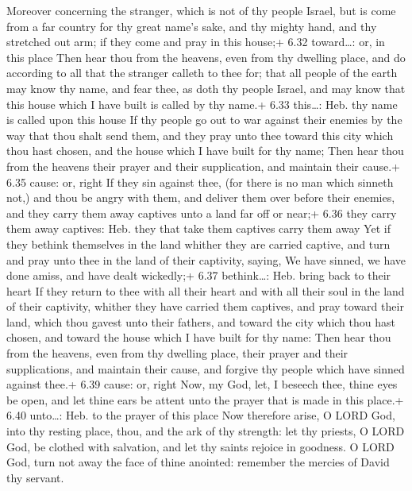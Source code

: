  Moreover concerning the stranger, which is not of thy
people Israel, but is come from a far country for thy great name's sake,
and thy mighty hand, and thy stretched out arm; if they come and pray in
this house;+ 6.32 toward\ldots: or, in this place  Then
hear thou from the heavens, even from thy dwelling place, and do
according to all that the stranger calleth to thee for; that all people
of the earth may know thy name, and fear thee, as doth thy people
Israel, and may know that this house which I have built is called by thy
name.+ 6.33 this\ldots: Heb. thy name is called upon this house
 If thy people go out to war against their enemies by the
way that thou shalt send them, and they pray unto thee toward this city
which thou hast chosen, and the house which I have built for thy name;
 Then hear thou from the heavens their prayer and their
supplication, and maintain their cause.+ 6.35 cause: or, right
 If they sin against thee, (for there is no man which
sinneth not,) and thou be angry with them, and deliver them over before
their enemies, and they carry them away captives unto a land far off or
near;+ 6.36 they carry them away captives: Heb. they that take them
captives carry them away  Yet if they bethink themselves in
the land whither they are carried captive, and turn and pray unto thee
in the land of their captivity, saying, We have sinned, we have done
amiss, and have dealt wickedly;+ 6.37 bethink\ldots: Heb. bring back to
their heart  If they return to thee with all their heart
and with all their soul in the land of their captivity, whither they
have carried them captives, and pray toward their land, which thou
gavest unto their fathers, and toward the city which thou hast chosen,
and toward the house which I have built for thy name:  Then
hear thou from the heavens, even from thy dwelling place, their prayer
and their supplications, and maintain their cause, and forgive thy
people which have sinned against thee.+ 6.39 cause: or, right
 Now, my God, let, I beseech thee, thine eyes be open, and
let thine ears be attent unto the prayer that is made in this place.+
6.40 unto\ldots: Heb. to the prayer of this place  Now
therefore arise, O LORD God, into thy resting place, thou, and the ark
of thy strength: let thy priests, O LORD God, be clothed with salvation,
and let thy saints rejoice in goodness.  O LORD God, turn
not away the face of thine anointed: remember the mercies of David thy
servant.

